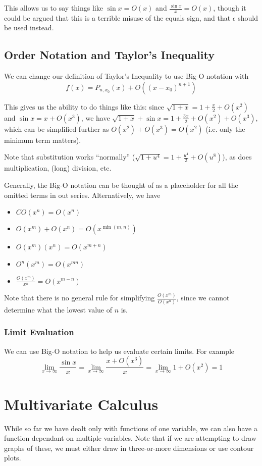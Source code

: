 \documentclass[12pt]{article}
\begin{document}
This allows us to say things like $\sin x = O(x)$ and $\frac{\sin x}{x} = O(x)$, though it could be argued that this is a terrible misuse of the equals sign, and that $\epsilon$ should be used instead.

\subsection*{Order Notation and Taylor's Inequality}
We can change our definition of Taylor's Inequality to use Big-O notation with \[ f(x) = P_{n,x_0} (x) + O((x-x_0)^{n+1}) \]

This gives us the ability to do things like this: since $\sqrt{1 + x} = 1 + \frac{x}{2} + O(x^2)$ and $\sin x = x + O(x^3)$, we have $\sqrt{1+x} + \sin x = 1 + \frac{3x}{2} + O(x^2) + O(x^3)$, which can be simplified further as $O(x^2) + O(x^3) = O(x^2)$ (i.e. only the minimum term matters).

Note that substitution works ``normally'' ($\sqrt{1 + u^4} = 1 + \frac{u^4}{2} + O(u^8)$), as does multiplication, (long) division, etc.

Generally, the Big-O notation can be thought of as a placeholder for all the omitted terms in out series. Alternatively, we have
\begin{itemize}
\item $C O(x^n) = O(x^n)$
\item $O(x^m) + O(x^n) = O(x^{\min(m,n)})$
\item $O(x^m)(x^n) = O(x^{m+n})$
\item $O^n(x^m) = O(x^{mn})$
\item $\frac{O(x^m)}{x^n} = O(x^{m-n})$
\end{itemize}
Note that there is no general rule for simplifying $\frac{O(x^m)}{O(x^n)}$, since we cannot determine what the lowest value of $n$ is.

\subsubsection*{Limit Evaluation}
We can use Big-O notation to help us evaluate certain limits. For example \[ \lim_{x\to\infty} \frac{\sin x}{x} = \lim_{x\to\infty} \frac{x+O(x^3)}{x} = \lim_{x\to\infty} 1 + O(x^2) = 1 \]

\section*{Multivariate Calculus}
While so far we have dealt only with functions of one variable, we can also have a function dependant on multiple variables. Note that if we are attempting to draw graphs of these, we must either draw in three-or-more dimensions or use contour plots.
\end{document}
